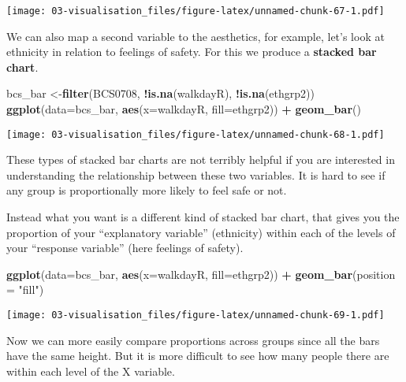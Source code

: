 \documentclass[
]{book}
\newenvironment{Shaded}{\begin{snugshade}}{\end{snugshade}}
\newcommand{\AttributeTok}[1]{\textcolor[rgb]{0.13,0.29,0.53}{#1}}
\newcommand{\FunctionTok}[1]{\textcolor[rgb]{0.13,0.29,0.53}{\textbf{#1}}}
\newcommand{\NormalTok}[1]{#1}
\newcommand{\OtherTok}[1]{\textcolor[rgb]{0.56,0.35,0.01}{#1}}
\newcommand{\SpecialCharTok}[1]{\textcolor[rgb]{0.81,0.36,0.00}{\textbf{#1}}}
\newcommand{\StringTok}[1]{\textcolor[rgb]{0.31,0.60,0.02}{#1}}
\begin{document}
\texttt{[image: 03-visualisation\_files/figure-latex/unnamed-chunk-67-1.pdf]}

We can also map a second variable to the aesthetics, for example, let's look at ethnicity in relation to feelings of safety. For this we produce a \textbf{stacked bar chart}.

\begin{Shaded}
\begin{Highlighting}[]
\NormalTok{bcs\_bar }\OtherTok{\textless{}{-}}\FunctionTok{filter}\NormalTok{(BCS0708, }\SpecialCharTok{!}\FunctionTok{is.na}\NormalTok{(walkdayR), }\SpecialCharTok{!}\FunctionTok{is.na}\NormalTok{(ethgrp2))}
\FunctionTok{ggplot}\NormalTok{(}\AttributeTok{data=}\NormalTok{bcs\_bar, }\FunctionTok{aes}\NormalTok{(}\AttributeTok{x=}\NormalTok{walkdayR, }\AttributeTok{fill=}\NormalTok{ethgrp2)) }\SpecialCharTok{+}
  \FunctionTok{geom\_bar}\NormalTok{()}
\end{Highlighting}
\end{Shaded}

\texttt{[image: 03-visualisation\_files/figure-latex/unnamed-chunk-68-1.pdf]}

These types of stacked bar charts are not terribly helpful if you are interested in understanding the relationship between these two variables. It is hard to see if any group is proportionally more likely to feel safe or not.

Instead what you want is a different kind of stacked bar chart, that gives you the proportion of your ``explanatory variable'' (ethnicity) within each of the levels of your ``response variable'' (here feelings of safety).

\begin{Shaded}
\begin{Highlighting}[]
\FunctionTok{ggplot}\NormalTok{(}\AttributeTok{data=}\NormalTok{bcs\_bar, }\FunctionTok{aes}\NormalTok{(}\AttributeTok{x=}\NormalTok{walkdayR, }\AttributeTok{fill=}\NormalTok{ethgrp2)) }\SpecialCharTok{+}
  \FunctionTok{geom\_bar}\NormalTok{(}\AttributeTok{position =} \StringTok{"fill"}\NormalTok{)}
\end{Highlighting}
\end{Shaded}

\texttt{[image: 03-visualisation\_files/figure-latex/unnamed-chunk-69-1.pdf]}

Now we can more easily compare proportions across groups since all the bars have the same height. But it is more difficult to see how many people there are within each level of the X variable.
\end{document}
